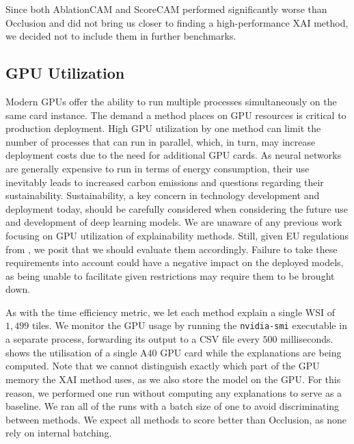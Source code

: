 Since both AblationCAM and ScoreCAM performed significantly worse than Occlusion and did not bring us closer to finding a high-performance XAI method, we decided not to include them in further benchmarks.

\subsection*{GPU Utilization}

Modern GPUs offer the ability to run multiple processes simultaneously on the same card instance.
The demand a method places on GPU resources is critical to production deployment.
High GPU utilization by one method can limit the number of processes that can run in parallel, which, in turn, may increase deployment costs due to the need for additional GPU cards.
As neural networks are generally expensive to run in terms of energy consumption, their use inevitably leads to increased carbon emissions and questions regarding their sustainability.
Sustainability, a key concern in technology development and deployment today, should be carefully considered when considering the future use and development of deep learning models.
We are unaware of any previous work focusing on GPU utilization of explainability methods.
Still, given EU regulations from , we posit that we should evaluate them accordingly.
Failure to take these requirements into account could have a negative impact on the deployed models, as being unable to facilitate given restrictions may require them to be brought down.

As with the time efficiency metric, we let each method explain a single WSI of $1,499$ tiles.
We monitor the GPU usage by running the \texttt{nvidia-smi} executable in a separate process, forwarding its output to a CSV file every $500$ milliseconds.
 shows the utilisation of a single A40 GPU card while the explanations are being computed.
Note that we cannot distinguish exactly which part of the GPU memory the XAI method uses, as we also store the model on the GPU.
For this reason, we performed one run without computing any explanations to serve as a baseline.
We ran all of the runs with a batch size of one to avoid discriminating between methods.
We expect all methods to score better than Occlusion, as none rely on internal batching.

